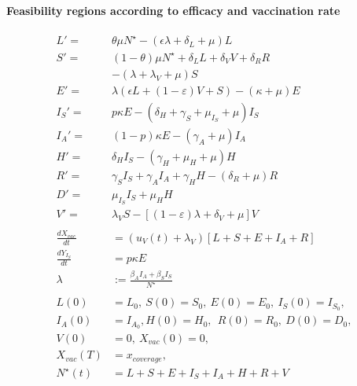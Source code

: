 \paragraph{Feasibility regions according to efficacy and vaccination rate}
%
\begin{equation}
    \label{eqn:vacination_dynamics}
    \begin{aligned}
        L' =&  \theta \mu N^{\star}
                -(\epsilon \lambda + \delta_L + \mu) L 
        \\
        S' =&
        	(1 - \theta) \mu N^\star
            + \delta_L L
            + \delta_V V
            + \delta_R R
        	\\
            &-
            \left(
            	\lambda + \lambda_V + \mu
            \right) S
        \\
        E' =&
                \lambda (\epsilon L + (1-\varepsilon) V + S)
                - (\kappa + \mu) E
        \\
        I_S' =&
        	p \kappa E
            - 
            (	
            	\delta_H +
            	\gamma_S +
                \mu_{I_S} +
                \mu
            ) I_S
        \\
        I_A' = &
                (1 - p) \kappa E - (\gamma_A + \mu) I_A
        \\
        H' = &
        		\delta_H I_S - (\gamma_H + \mu_H + \mu) H
        \\
        R' = &
            	\gamma_S I_S +
                \gamma_A I_A +
                \gamma_H H 
                - (\delta_R + \mu) R
        \\
        D'  = &
                \mu_{I_S} I_S + \mu_H H
        \\
        V' = &
            \lambda_V  S
            - \left[
            	(1 - \varepsilon) \lambda
                + \delta_V
                + \mu
            \right ] V
        \\
        \\
            \frac{dX_{vac}}{dt}
            	&=
            	(u_V(t) + \lambda_V)
            	\left[
            		L + S + E + I_A + R
            	\right]
        \\
            \frac{d Y_{I_S}}{dt}
            	& = p \kappa E
        \\
            \lambda &:=
                \frac{\beta_A I_A + \beta_S I_S}{N^{\star}}
        \\
        \\
            L(0) &= L_0, 
            \ S(0) = S_0, 
            \ E(0) = E_0, 
            \ I_S(0) = I_{S_{0}},
      \\
            I_A(0) &= I_{A_{0}},
            H(0) = H_0, \
            \ R(0) = R_0, \ D(0) = D_0,
      \\
            V(0) &= 0, \ X_{vac}(0) = 0, \quad
      \\
            X_{vac}(T) &= x_{coverage},
      \\
            N^{\star}(t) &=
                L + S +E + I_S + I_A +
                H + R + V
        \end{aligned}
\end{equation}
